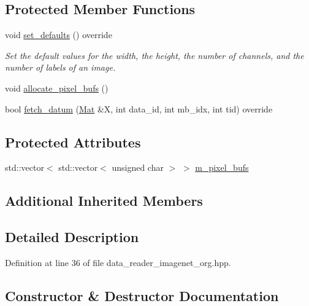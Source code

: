 \subsection*{Protected Member Functions}
\begin{DoxyCompactItemize}
\item 
void \hyperlink{classlbann_1_1imagenet__reader__org_af0d9fc9081013ef0ddd3222dfd9abb8b}{set\+\_\+defaults} () override
\begin{DoxyCompactList}\small\item\em Set the default values for the width, the height, the number of channels, and the number of labels of an image. \end{DoxyCompactList}\item 
void \hyperlink{classlbann_1_1imagenet__reader__org_acbe8ed442b64a7391ffa63b0658641c0}{allocate\+\_\+pixel\+\_\+bufs} ()
\item 
bool \hyperlink{classlbann_1_1imagenet__reader__org_ad4c47413e16c1c53000b7d7be757ff6e}{fetch\+\_\+datum} (\hyperlink{base_8hpp_a68f11fdc31b62516cb310831bbe54d73}{Mat} \&X, int data\+\_\+id, int mb\+\_\+idx, int tid) override
\end{DoxyCompactItemize}
\subsection*{Protected Attributes}
\begin{DoxyCompactItemize}
\item 
std\+::vector$<$ std\+::vector$<$ unsigned char $>$ $>$ \hyperlink{classlbann_1_1imagenet__reader__org_ad594a338f0ef9614b63a1950254eb034}{m\+\_\+pixel\+\_\+bufs}
\end{DoxyCompactItemize}
\subsection*{Additional Inherited Members}


\subsection{Detailed Description}


Definition at line 36 of file data\+\_\+reader\+\_\+imagenet\+\_\+org.\+hpp.



\subsection{Constructor \& Destructor Documentation}
\mbox{\label{classlbann_1_1imagenet__reader__org_a77d88b53b26f903855da22e5d77ef06a}} 
